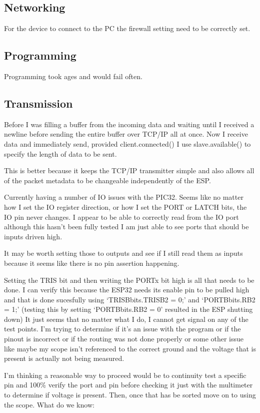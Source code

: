 \subsection{Networking}
For the device to connect to the PC the firewall setting need to be correctly set.

\subsection{Programming}
Programming took ages and would fail often.

\subsection{Transmission}
Before I was filling a buffer from the incoming data and waiting until I received
a newline before sending the entire buffer over TCP/IP all at once.
Now I receive data and immediately send, provided client.connected()
I use slave.available() to specify the length of data to be sent.

This is better because it keeps the TCP/IP transmitter simple and also allows all
of the packet metadata to be changeable independently of the ESP.

Currently having a number of IO issues with the PIC32.
Seems like no matter how I set the IO register direction, or how I set
the PORT or LATCH bits, the IO pin never changes.
I appear to be able to correctly read from the IO port although this
hasn't been fully tested I am just able to see ports that should be
inputs driven high.

It may be worth setting those to outputs and see if I still read them
as inputs because it seems like there is no pin assertion happening.

Setting the TRIS bit and then writing the PORTx bit high is all that
needs to be done.
I can verify this because the ESP32 needs its enable pin to be pulled
high and that is done sucesfully using `TRISBbits.TRISB2 = 0;' and
`PORTBbits.RB2 = 1;'
(testing this by setting `PORTBbits.RB2 = 0' resulted in the ESP
shutting down)
It just seems that no matter what I do, I cannot get signal on any of
the test points. I'm trying to determine if it's an issue with the
program or if the pinout is incorrect or if the routing was not done
properly or some other issue like maybe my scope isn't referenced to
the correct ground and the voltage that is present is actually not
being measured.

I'm thinking a reasonable way to proceed would be to continuity test
a specific pin and 100\% verify the port and pin before checking it just
with the multimeter to determine if voltage is present. Then, once that
has be sorted move on to using the scope.
What do we know:

